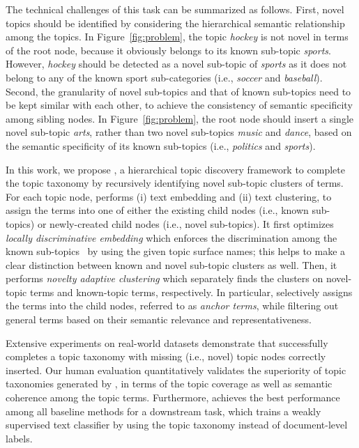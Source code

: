 The technical challenges of this task can be summarized as follows.
First, novel topics should be identified by considering the hierarchical semantic relationship among the topics.
In Figure~\ref{fig:problem}, the topic \textit{hockey} is not novel in terms of the root node, because it obviously belongs to its known sub-topic \textit{sports}.
However, \textit{hockey} should be detected as a novel sub-topic of \textit{sports} as it does not belong to any of the known sport sub-categories (i.e., \textit{soccer} and \textit{baseball}).
Second, the granularity of novel sub-topics and that of known sub-topics need to be kept similar with each other, to achieve the consistency of semantic specificity among sibling nodes.
In Figure~\ref{fig:problem}, the root node should insert a single novel sub-topic \textit{arts}, rather than two novel sub-topics \textit{music} and \textit{dance}, based on the semantic specificity of its known sub-topics (i.e., \textit{politics} and \textit{sports}).

In this work, we propose \proposed, a hierarchical topic discovery framework to complete the topic taxonomy by recursively identifying novel sub-topic clusters of terms.
For each topic node, \proposed performs (i) text embedding and (ii) text clustering, to assign the terms into one of either the existing child nodes (i.e., known sub-topics) or newly-created child nodes (i.e., novel sub-topics).
It first optimizes \textit{locally discriminative embedding} which enforces the discrimination among the known sub-topics~\cite{meng2020hierarchical, meng2020discriminative} by using the given topic surface names;
this helps to make a clear distinction between known and novel sub-topic clusters as well.
Then, it performs \textit{novelty adaptive clustering} which separately finds the clusters on novel-topic terms and known-topic terms, respectively.
In particular, \proposed selectively assigns the terms into the child nodes, referred to as \textit{anchor terms}, while filtering out general terms based on their semantic relevance and representativeness.

Extensive experiments on real-world datasets demonstrate that \proposed successfully completes a topic taxonomy with missing (i.e., novel) topic nodes correctly inserted.
Our human evaluation quantitatively validates the superiority of topic taxonomies generated by \proposed, in terms of the topic coverage as well as semantic coherence among the topic terms.
Furthermore, \proposed achieves the best performance among all baseline methods for a downstream task, which trains a weakly supervised text classifier by using the topic taxonomy instead of document-level labels.
